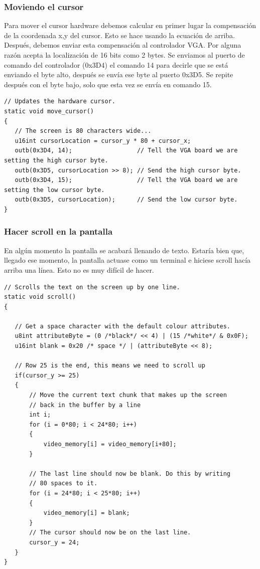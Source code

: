 \documentclass{report}
\begin{document}
\subsubsection{Moviendo el cursor}
Para mover el cursor hardware  debemos calcular en primer lugar la compensaci\'{o}n de la coordenada x,y del cursor. Esto se hace usando la ecuaci\'{o}n de arriba. Despu\'{e}s, debemos enviar esta compensaci\'{o}n al controlador VGA. Por alguna raz\'{o}n acepta la localizaci\'{o}n de 16 bits como 2 bytes. Se enviamos al puerto de comando del controlador (0x3D4) el comando 14 para decirle que se est\'{a} enviando el byte alto, despu\'{e}s se env\'{i}a ese byte al puerto 0x3D5. Se repite despu\'{e}s con el byte bajo, solo que esta vez se env\'{i}a en comando 15.

\begin{lstlisting}
// Updates the hardware cursor.
static void move_cursor()
{
   // The screen is 80 characters wide...
   u16int cursorLocation = cursor_y * 80 + cursor_x;
   outb(0x3D4, 14);                  // Tell the VGA board we are setting the high cursor byte.
   outb(0x3D5, cursorLocation >> 8); // Send the high cursor byte.
   outb(0x3D4, 15);                  // Tell the VGA board we are setting the low cursor byte.
   outb(0x3D5, cursorLocation);      // Send the low cursor byte.
}
\end{lstlisting}

\subsubsection{Hacer scroll en la pantalla}
En alg\'{u}n momento la pantalla se acabar\'{a} llenando de texto. Estar\'{i}a bien que, llegado ese momento, la pantalla actuase como un terminal e hiciese scroll hac\'{i}a arriba una l\'{i}nea. Esto no es muy dif\'{i}cil de hacer.

\begin{lstlisting}
// Scrolls the text on the screen up by one line.
static void scroll()
{

   // Get a space character with the default colour attributes.
   u8int attributeByte = (0 /*black*/ << 4) | (15 /*white*/ & 0x0F);
   u16int blank = 0x20 /* space */ | (attributeByte << 8);

   // Row 25 is the end, this means we need to scroll up
   if(cursor_y >= 25)
   {
       // Move the current text chunk that makes up the screen
       // back in the buffer by a line
       int i;
       for (i = 0*80; i < 24*80; i++)
       {
           video_memory[i] = video_memory[i+80];
       }

       // The last line should now be blank. Do this by writing
       // 80 spaces to it.
       for (i = 24*80; i < 25*80; i++)
       {
           video_memory[i] = blank;
       }
       // The cursor should now be on the last line.
       cursor_y = 24;
   }
}
\end{lstlisting}
\end{document}
